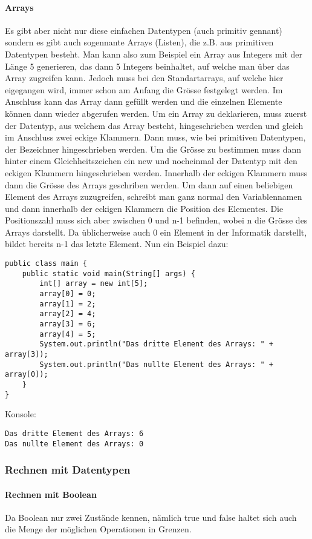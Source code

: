 \paragraph{Arrays}
Es gibt aber nicht nur diese einfachen Datentypen (auch primitiv gennant) sondern es gibt auch sogennante Arrays (Listen), die z.B. aus primitiven Datentypen besteht. Man kann also zum Beispiel ein Array aus Integers mit der Länge 5 generieren, das dann 5 Integers beinhaltet, auf welche man über das Array zugreifen kann. Jedoch muss bei den Standartarrays, auf welche hier eigegangen wird, immer schon am Anfang die Grösse festgelegt werden. Im Anschluss kann das Array dann gefüllt werden und die einzelnen Elemente können dann wieder abgerufen werden. Um ein Array zu deklarieren, muss zuerst der Datentyp, aus welchem das Array besteht, hingeschrieben werden und gleich im Anschluss zwei eckige Klammern. Dann muss, wie bei primitiven Datentypen, der Bezeichner hingeschrieben werden. Um die Grösse zu bestimmen muss dann hinter einem Gleichheitszeichen ein new und nocheinmal der Datentyp mit den eckigen Klammern hingeschrieben werden. Innerhalb der eckigen Klammern muss dann die Grösse des Arrays geschriben werden. Um dann auf einen beliebigen Element des Arrays zuzugreifen, schreibt man ganz normal den Variablennamen und dann innerhalb der eckigen Klammern die Position des Elementes. Die Positionszahl muss sich aber zwischen 0 und n-1 befinden, wobei n die Grösse des Arrays darstellt. Da üblicherweise auch 0 ein Element in der Informatik darstellt, bildet bereits n-1 das letzte Element. Nun ein Beispiel dazu:
\begin{lstlisting}
public class main {
	public static void main(String[] args) {
		int[] array = new int[5];
		array[0] = 0;
		array[1] = 2;
		array[2] = 4;
		array[3] = 6;
		array[4] = 5;
		System.out.println("Das dritte Element des Arrays: " + array[3]);
		System.out.println("Das nullte Element des Arrays: " + array[0]);
	}
}
\end{lstlisting}
Konsole:
\begin{lstlisting}[style=console]
Das dritte Element des Arrays: 6
Das nullte Element des Arrays: 0
\end{lstlisting}
\subsubsection{Rechnen mit Datentypen}
\paragraph{Rechnen mit Boolean}
Da Boolean nur zwei Zustände kennen, nämlich true und false haltet sich auch die Menge der möglichen Operationen in Grenzen. 	

